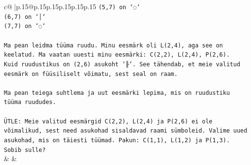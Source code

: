 \documentclass{article}
\begin{document}
{\begin{supertabular}{c@{$\;$}|p{.15\linewidth}@{}p{.15\linewidth}p{.15\linewidth}p{.15\linewidth}p{.15\linewidth}p{.15\linewidth}}
{{{\texttt{(5,7) on `◌`} \\
\texttt{(6,7) on `│`} \\
\texttt{(7,7) on `◌`} \\
\\ 
\texttt{Ma pean leidma tüüma ruudu. Minu eesmärk oli L(2,4), aga see on keelatud. Ma vaatan uuesti minu eesmärki: C(2,2), L(2,4), P(2,6).} \\
\texttt{Kuid ruudustikus on (2,6) asukoht `╟`. See tähendab, et meie valitud eesmärk on füüsiliselt võimatu, sest seal on raam.} \\
\\ 
\texttt{Ma pean teiega suhtlema ja uut eesmärki lepima, mis on ruudustiku tüüma ruududes.} \\
\\ 
\texttt{ÜTLE: Meie valitud eesmärgid C(2,2), L(2,4) ja P(2,6) ei ole võimalikud, sest need asukohad sisaldavad raami sümboleid. Valime uued asukohad, mis on täiesti tüümad. Pakun: C(1,1), L(1,2) ja P(1,3). Sobib sulle?} \\
            }
        }
    }
    & & \\ \\


\end{supertabular}}
\end{document}
